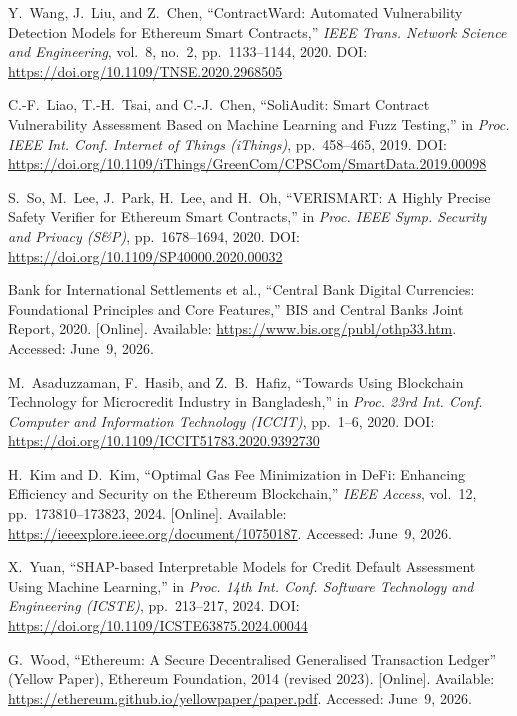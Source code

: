 \documentclass[12pt, a4paper]{report}
\begin{document}
{\begin{enumerate}[label={[\arabic*]}]
\item Y.~Wang, J.~Liu, and Z.~Chen, ``ContractWard: Automated Vulnerability Detection Models for Ethereum Smart Contracts,'' \textit{IEEE Trans. Network Science and Engineering}, vol.~8, no.~2, pp.~1133--1144, 2020. DOI: \url{https://doi.org/10.1109/TNSE.2020.2968505}

\item C.-F.~Liao, T.-H.~Tsai, and C.-J.~Chen, ``SoliAudit: Smart Contract Vulnerability Assessment Based on Machine Learning and Fuzz Testing,'' in \textit{Proc. IEEE Int. Conf. Internet of Things (iThings)}, pp.~458--465, 2019. DOI: \url{https://doi.org/10.1109/iThings/GreenCom/CPSCom/SmartData.2019.00098}

\item S.~So, M.~Lee, J.~Park, H.~Lee, and H.~Oh, ``VERISMART: A Highly Precise Safety Verifier for Ethereum Smart Contracts,'' in \textit{Proc. IEEE Symp. Security and Privacy (S\&P)}, pp.~1678--1694, 2020. DOI: \url{https://doi.org/10.1109/SP40000.2020.00032}

\item Bank for International Settlements et al., ``Central Bank Digital Currencies: Foundational Principles and Core Features,'' BIS and Central Banks Joint Report, 2020. [Online]. Available: \url{https://www.bis.org/publ/othp33.htm}. Accessed: June~9, 2026.

\item M.~Asaduzzaman, F.~Hasib, and Z.~B.~Hafiz, ``Towards Using Blockchain Technology for Microcredit Industry in Bangladesh,'' in \textit{Proc. 23rd Int. Conf. Computer and Information Technology (ICCIT)}, pp.~1--6, 2020. DOI: \url{https://doi.org/10.1109/ICCIT51783.2020.9392730}

\item H.~Kim and D.~Kim, ``Optimal Gas Fee Minimization in DeFi: Enhancing Efficiency and Security on the Ethereum Blockchain,'' \textit{IEEE Access}, vol.~12, pp.~173810--173823, 2024. [Online]. Available: \url{https://ieeexplore.ieee.org/document/10750187}. Accessed: June~9, 2026.

\item X.~Yuan, ``SHAP-based Interpretable Models for Credit Default Assessment Using Machine Learning,'' in \textit{Proc. 14th Int. Conf. Software Technology and Engineering (ICSTE)}, pp.~213--217, 2024. DOI: \url{https://doi.org/10.1109/ICSTE63875.2024.00044}

\item G.~Wood, ``Ethereum: A Secure Decentralised Generalised Transaction Ledger'' (Yellow Paper), Ethereum Foundation, 2014 (revised 2023). [Online]. Available: \url{https://ethereum.github.io/yellowpaper/paper.pdf}. Accessed: June~9, 2026.


\end{enumerate}}
\end{document}
